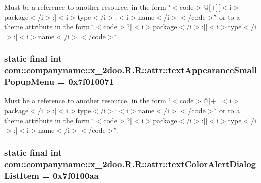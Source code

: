 Must be a reference to another resource, in the form \char`\"{}$<$code$>$@\mbox{[}+\mbox{]}\mbox{[}$<$i$>$package$<$/i$>$:\mbox{]}$<$i$>$type$<$/i$>$:$<$i$>$name$<$/i$>$$<$/code$>$\char`\"{} or to a theme attribute in the form \char`\"{}$<$code$>$?\mbox{[}$<$i$>$package$<$/i$>$:\mbox{]}\mbox{[}$<$i$>$type$<$/i$>$:\mbox{]}$<$i$>$name$<$/i$>$$<$/code$>$\char`\"{}. \hypertarget{classcom_1_1companyname_1_1x__2doo_1_1_r_1_1attr_f1663eed3dbdfc28b318623f565e4b0d}{
\subsubsection[{textAppearanceSmallPopupMenu}]{\setlength{\rightskip}{0pt plus 5cm}static final int com::companyname::x\_\-2doo.R.R::attr::textAppearanceSmallPopupMenu = 0x7f010071}}
\label{classcom_1_1companyname_1_1x__2doo_1_1_r_1_1attr_f1663eed3dbdfc28b318623f565e4b0d}


Must be a reference to another resource, in the form \char`\"{}$<$code$>$@\mbox{[}+\mbox{]}\mbox{[}$<$i$>$package$<$/i$>$:\mbox{]}$<$i$>$type$<$/i$>$:$<$i$>$name$<$/i$>$$<$/code$>$\char`\"{} or to a theme attribute in the form \char`\"{}$<$code$>$?\mbox{[}$<$i$>$package$<$/i$>$:\mbox{]}\mbox{[}$<$i$>$type$<$/i$>$:\mbox{]}$<$i$>$name$<$/i$>$$<$/code$>$\char`\"{}. \hypertarget{classcom_1_1companyname_1_1x__2doo_1_1_r_1_1attr_8a424228ee251472c1d91f95b08e3912}{
\subsubsection[{textColorAlertDialogListItem}]{\setlength{\rightskip}{0pt plus 5cm}static final int com::companyname::x\_\-2doo.R.R::attr::textColorAlertDialogListItem = 0x7f0100aa}}
\label{classcom_1_1companyname_1_1x__2doo_1_1_r_1_1attr_8a424228ee251472c1d91f95b08e3912}


